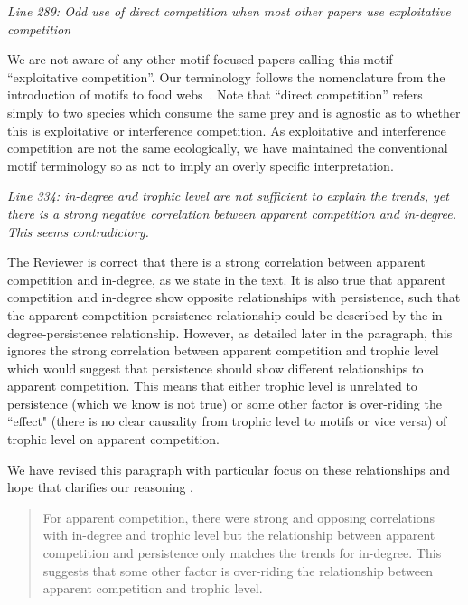 \documentclass[12pt]{article}
\newcommand{\us}{\rm \setlength{\leftskip}{0.3cm} \setlength{\rightskip}{0.3cm}}
\newcommand{\them}{\it \setlength{\leftskip}{0cm} \setlength{\rightskip}{0cm}}
\begin{document}
        \them
        Line 289: Odd use of direct competition when most other papers use exploitative competition
        
        \us We are not aware of any other motif-focused papers calling this motif ``exploitative competition''. Our terminology follows the nomenclature from the introduction of motifs to food webs~\citep{Stouffer2007}.
        Note that ``direct competition'' refers simply to two species which consume the same prey and is agnostic as to whether this is exploitative or interference competition. 
        As exploitative and interference competition are not the same ecologically, we have maintained the conventional motif terminology so as not to imply an overly specific interpretation.
        
        
        \them
        Line 334: in-degree and trophic level are not sufficient to explain the trends, yet there is a strong negative correlation between apparent competition and in-degree. This seems contradictory.
        
        \us The Reviewer is correct that there is a strong  correlation between apparent competition and in-degree, as we state in the text. It is also true that apparent competition and in-degree show opposite relationships with persistence, such that the apparent competition-persistence relationship could be described by the in-degree-persistence relationship. However, as detailed later in the paragraph, this ignores the strong correlation between apparent competition and trophic level which would suggest that persistence should show different relationships to apparent competition. This means that either trophic level is unrelated to persistence (which we know is not true) or some other factor is over-riding the ``effect" (there is no clear causality from trophic level to motifs or vice versa) of trophic level on apparent competition.
        
        
        We have revised this paragraph with particular focus on these relationships and hope that clarifies our reasoning . %
        
        \begin{quotation}
            For apparent competition, there were strong and opposing correlations with in-degree and trophic level but the relationship between apparent competition and persistence only matches the trends for in-degree.
            This suggests that some other factor is over-riding the relationship between apparent competition and trophic level.        
        \end{quotation}
        
\end{document}
